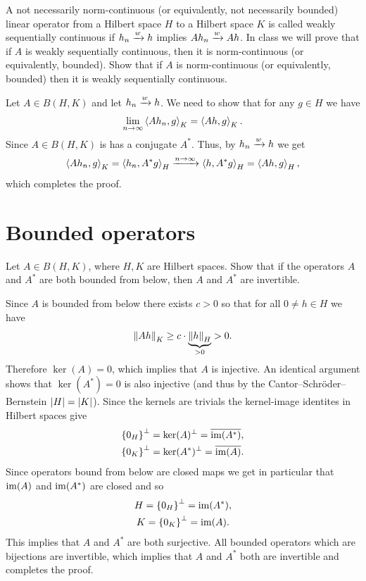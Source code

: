 \documentclass[11pt,a4paper]{article}
\begin{document}
\begin{exercise}
  A not necessarily norm-continuous
  (or equivalently, not necessarily bounded)
  linear operator from a Hilbert space $H$ to a Hilbert space $K$
  is called weakly sequentially continuous if $h_n \xrightarrow{w} h$
  implies $Ah_n \xrightarrow{w} Ah$.
  In class we will prove that if $A$
  is weakly sequentially continuous,
  then it is norm-continuous (or equivalently, bounded).
  Show that if $A$ is norm-continuous
  (or equivalently, bounded)
  then it is weakly sequentially continuous.
\end{exercise}
\begin{solution}
  Let $A \in B(H,K)$
  and let $h_n \xrightarrow{w} h$.
  We need to show that for any $g \in H$ we have
  \[
    \lim_{n \to \infty} \left\langle Ah_n, g \right\rangle_K = \left\langle Ah, g \right\rangle_K.
  \]
  Since $A \in B(H,K)$ is has a conjugate $A^*$.
  Thus, by $h_n \xrightarrow{w} h$ we get
  \[
    \left\langle Ah_n, g \right\rangle_K =
    \left\langle h_n, A^* g \right\rangle_H \xrightarrow{n \to \infty}
    \left\langle h, A^* g \right\rangle_H =
    \left\langle Ah, g \right\rangle_H,
  \]
  which completes the proof.
\end{solution}

\newpage

\section{Bounded operators}

\begin{exercise}
  Let $A \in B(H,K)$,
  where $H,K$ are Hilbert spaces.
  Show that if the operators $A$ and $A^*$
  are both bounded from below, then $A$ and $A^*$ are invertible.
\end{exercise}
\begin{solution}
  Since $A$ is bounded from below there exists $c > 0$ so that
  for all $0 \neq h \in H$ we have
  \[
    \left\lVert A h\right\rVert_{K} \geq c \cdot \underbrace{\left\lVert h\right\rVert_{H}}_{> 0} > 0.
  \]
  Therefore $\ker(A) = 0$, which implies that $A$ is injective.
  An identical argument shows that $\ker(A^*) = 0$ is also injective
  (and thus by the Cantor--Schr\"oder--Bernstein $\left\lvert H\right\rvert = \left\lvert K\right\rvert$).
  Since the kernels are trivials the kernel-image identites in Hilbert
  spaces give
  \begin{gather*}
    \left\{0_H\right\}^{\perp} = \ker(A)^{\perp} = \overline{\operatorname{im}(A^*)}, \\
    \left\{0_K\right\}^{\perp} = \ker(A^*)^{\perp} = \overline{\operatorname{im}(A)}.
  \end{gather*}
  Since operators bound from below are closed maps we get in particular
  that $\operatorname{im}(A)$ and $\operatorname{im}(A^*)$ are closed and so
  \begin{gather*}
    H = \left\{0_H\right\}^{\perp} = \operatorname{im}(A^*), \\
    K = \left\{0_K\right\}^{\perp} = \operatorname{im}(A).
  \end{gather*}
  This implies that $A$ and $A^*$ are both surjective.
  All bounded operators which are bijections are invertible,
  which implies that $A$ and $A^*$ both are invertible and completes the proof.
\end{solution}
\end{document}
